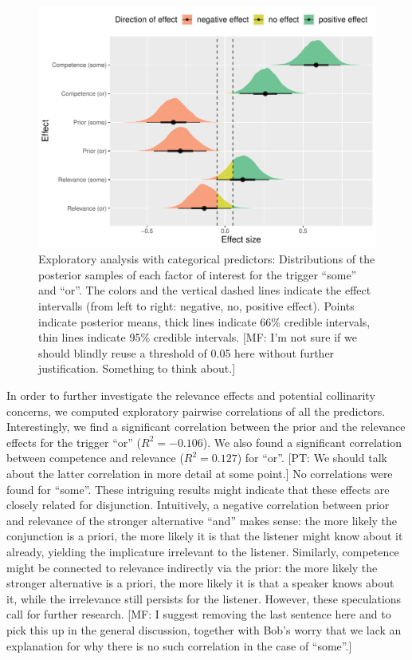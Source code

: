 \documentclass{sp}
\newcommand{\mf}[1]{\textcolor{BurntOrange}{[MF: #1]}}
\newcommand{\pt}[1]{\textcolor{Cerulean}{[PT: #1]}}
\begin{document}
\begin{figure}[h]
	\begin{center}
		\includegraphics[width=1\linewidth]{images/posterior-effects-categorical-noDupl.pdf}
	\end{center}
	\vspace{-0.3cm}
	\caption{Exploratory analysis with categorical predictors: Distributions of the posterior samples of each factor of interest for the trigger ``some'' and ``or''. The colors and the vertical dashed lines indicate the effect intervalls (from left to right: negative, no, positive effect). Points indicate posterior means, thick lines indicate 66\% credible intervals, thin lines indicate 95\% credible intervals. \mf{I'm not sure if we should blindly reuse a threshold of 0.05 here without further justification. Something to think about.}}
	\label{posteriors-cat}
\end{figure}

In order to further investigate the relevance effects and potential collinarity concerns, we computed exploratory pairwise correlations of all the predictors. Interestingly, we find a significant correlation between the prior and the relevance effects for the trigger ``or'' ($R^2 = -0.106$). We also found a significant correlation between competence and relevance ($R^2 = 0.127$) for ``or''. \pt{We should talk about the latter correlation in more detail at some point.} No correlations were found for ``some''. These intriguing results might indicate that these effects are closely related for disjunction. Intuitively, a negative correlation between prior and relevance of the stronger alternative ``and'' makes sense: the more likely the conjunction is a priori, the more likely it is that the listener might know about it already, yielding the implicature irrelevant to the listener. Similarly, competence might be connected to relevance indirectly via the prior: the more likely the stronger alternative is a priori, the more likely it is that a speaker knows about it, while the irrelevance still persists for the listener. However, these speculations call for further research. \mf{I suggest removing the last sentence here and to pick this up in the general discussion, together with Bob's worry that we lack an explanation for why there is no such correlation in the case of ``some''.}
\end{document}
